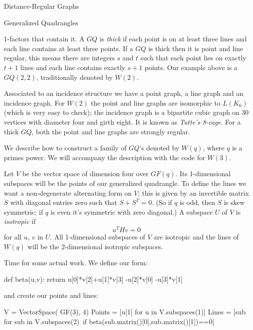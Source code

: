\begin{chap}{Distance-Regular Graphs}
\begin{sect}{Generalized Quadrangles}
\begin{para}
1-factors that contain it. A $GQ$ is \textsl{thick} if each point is on at least 
three lines and each line contains at least three points. If a $GQ$ is thick then
it is point and line regular, this means there are integers $s$ and $t$ such that
each point lies on exactly $t+1$ lines and each line contains exactly $s+1$
points. Our example above is a $GQ(2,2)$, traditionally denoted by $W(2)$.
\end{para}
%
\begin{para}
Associated to an incidence structure we have a point graph, a line graph
and an incidence graph.  For $W(2)$ the point and line graphs are isomorphic
to $L(K_6)$ (which is very easy to check); the incidence graph is
a bipartite cubic graph on 30 vertices with diameter four and girth eight.
It is known as \textsl{Tutte's 8-cage}. For a thick $GQ$, both the point
and line graphs are strongly regular.
\end{para}
%
\begin{para}
We describe how to construct a family of $GQ$'s denoted by $W(q)$, where
$q$ is a primes power. We will accompany the description with the
code for $W(3)$.
\end{para}
%
\begin{para}
Let $V$ be the vector space of dimension four over $GF(q)$. Its 1-dimensional
subspaces will be the points of our generalized quadrangle. To define
the lines we want a non-degenerate alternating form on $V$; this is
given by an invertible matrix $S$ with diagonal entries zero such that $S+S^T=0$.
(So if $q$ is odd, then $S$ is skew symmetric; if $q$ is even it's symmetric
with zero diagonal.) A subspace $U$ of $V$ is \textsl{isotropic}
if
\[
    u^THv = 0
\]
for all $u$, $v$ in $U$. All 1-dimensional subspaces of $V$ are isotropic and the
lines of $W(q)$ will be the 2-dimensional isotropic subspaces.
\end{para}
%
\begin{para}
Time for some actual work. We define our form:
\end{para}
%
\begin{sageblock}
def beta(u,v):
    return u[0]*v[2]+u[1]*v[3] -u[2]*v[0] -u[3]*v[1]
\end{sageblock}
%
\begin{para}
and create our points and lines:
\end{para}
%
\begin{sageblock}
    V = VectorSpace( GF(3), 4)
    Points = [u[1] for u in V.subspaces(1)]
    Lines = [sub for sub in V.subspaces(2)\
      if beta(sub.matrix()[0],sub.matrix()[1])==0]

\end{sageblock}
\end{sect}
\end{chap}
